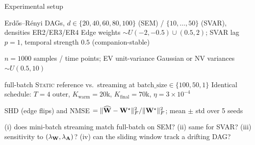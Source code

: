 \documentclass[9pt, aspectratio=169, xcolor=table]{beamer}
\begin{document}
\begin{frame}{Experimental setup}\svpos

	\bi {} Erd\H{o}s--R\'enyi DAGs, $d\in\{20,40,60,80,100\}$ (SEM) / $\{10,\ldots,50\}$ (SVAR), densities ER2/ER3/ER4
	\ai Edge weights $\sim U(-2,-0.5)\cup(0.5,2)$; SVAR lag $p=1$, temporal strength $0.5$ (companion-stable)\ei \svpos

	\bi {} $n=1000$ samples / time points; EV unit-variance Gaussian or NV variances $\sim U(0.5,10)$ \ei \svpos

	\bi {} full-batch \textsc{Static} reference vs.\ streaming at $\mathrm{batch\_size}\in\{100,50,1\}$
	\ai Identical schedule: $T=4$ outer, $K_{\mathrm{warm}}{=}20$k, $K_{\mathrm{final}}{=}70$k, $\eta=3\!\times\!10^{-4}$\ei \svpos

	\bi {} SHD (edge flips) and NMSE $=\|\widehat{{\mathbf W}}-{\mathbf W}^\star\|_F^2/\|{\mathbf W}^\star\|_F^2$; mean $\pm$ std over 5 seeds\ei \svpos

	\bi {} (i) does mini-batch streaming match full-batch on SEM? (ii) same for SVAR? (iii) sensitivity to $(\lambda_{{\mathbf W}},\lambda_{{\mathbf A}})$? (iv) can the sliding window track a drifting DAG?\ei

\end{frame}

\end{document}
